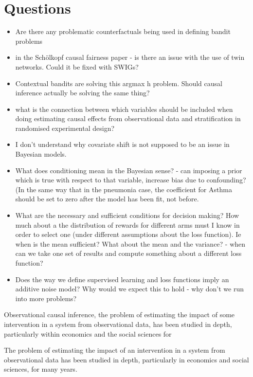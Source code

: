 \section*{Questions}
\begin{itemize}
\item Are there any problematic counterfactuals being used in defining bandit problems
\item in the Schölkopf causal fairness paper - is there an issue with the use of twin networks. Could it be fixed with SWIGs?
\item Contextual bandits are solving this argmax h problem. Should causal inference actually be solving the same thing?
\item what is the connection between which variables should be included when doing estimating causal effects from observational data and stratification in randomised experimental design?
\item I don't understand why covariate shift is not supposed to be an issue in Bayesian models. 
\item What does conditioning mean in the Bayesian sense? - can imposing a prior which is true with respect to that variable, increase bias due to confounding? (In the same way that in the pneumonia case, the coefficient for Asthma should be set to zero after the model has been fit, not before. 

\item What are the necessary and sufficient conditions for decision making? How much about a the distribution of rewards for different arms must I know in order to select one (under different assumptions about the loss function). Ie when is the mean sufficient? What about the mean and the variance? - when can we take one set of results and compute something about a different loss function?

\item Does the way we define supervised learning and loss functions imply an additive noise model? Why would we expect this to hold - why don't we run into more problems?
 

\end{itemize}




Observational causal inference, the problem of estimating the impact of some intervention in a system from observational data, has been studied in depth, particularly within economics and the social sciences for

The problem of estimating the impact of an intervention in a system from observational data has been studied in depth, particularly in economics and social sciences, for many years. 

